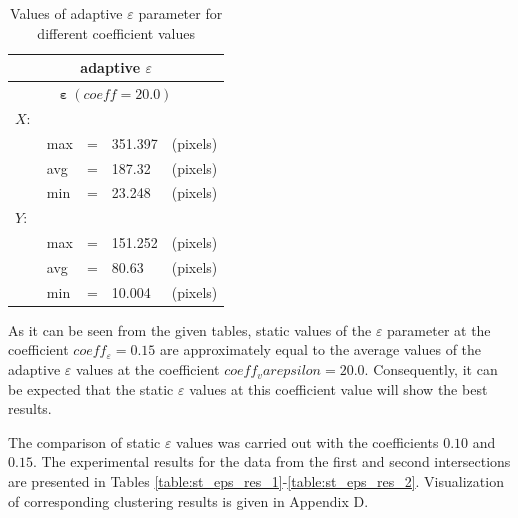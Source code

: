 \begin{table}[!htb]
	\caption{Values of adaptive $\varepsilon$ parameter for different coefficient values}
	\label{table:eps_adapt}
	
	\setlength{\tabcolsep}{10pt}
	\centering
	
	\begin{tabular}{||lllll||}
		\multicolumn{5}{c}{adaptive $\varepsilon$} \\
		\hline
		\multicolumn{5}{||c||}{$\bm{\varepsilon}\ (coeff = 20.0)$}\\
		$X:$       			& & & & \\[0.5ex]
		& max 	& = 	& 351.397 	& (pixels) \\[0.5ex]
		& avg 	& = 	& 187.32 	& (pixels) \\[0.5ex]
		& min 	& = 	& 23.248 	& (pixels) \\[0.5ex]
		$Y:$       			& & & & \\[0.5ex]
		& max 	& = 	& 151.252 	& (pixels) \\[0.5ex]
		& avg 	& = 	& 80.63 	& (pixels) \\[0.5ex]
		& min 	& = 	& 10.004 	& (pixels) \\[0.5ex]
		\hline
	\end{tabular}
\end{table}

As it can be seen from the given tables, static values of the $\varepsilon$ parameter at the coefficient $coeff_\varepsilon = 0.15$ are approximately equal to the average values of the adaptive $\varepsilon$ values at the coefficient $coeff_varepsilon = 20.0$. Consequently, it can be expected that the static $\varepsilon$ values ​​at this coefficient value will show the best results.

The comparison of static $\varepsilon$ values was carried out with the coefficients $0.10$ and $0.15$. The experimental results for the data from the first and second intersections are presented in Tables \ref{table:st_eps_res_1}-\ref{table:st_eps_res_2}. Visualization of corresponding clustering results is given in Appendix D.

